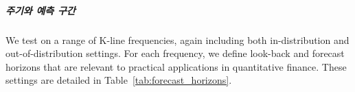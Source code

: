 \subparagraph{주기와 예측 구간} We test on a range of K-line frequencies, again including both in-distribution and out-of-distribution settings. For each frequency, we define look-back and forecast horizons that are relevant to practical applications in quantitative finance. These settings are detailed in Table~\ref{tab:forecast_horizons}.

\begin{table}[th]
\centering

\caption{Look-back and forecast horizon settings for each K-line frequency in the forecasting tasks.}
\label{tab:forecast_horizons}
\end{table}

